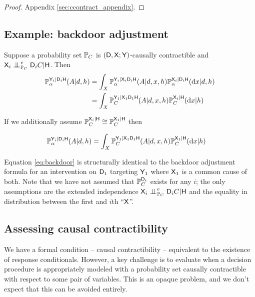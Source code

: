 \begin{proof}
Appendix \ref{sec:ccontract_appendix}.
\end{proof}


\subsection{Example: backdoor adjustment}

Suppose a probability set $\mathbb{P}_C$ is $(\mathsf{D},\mathsf{X};\mathsf{Y})$-causally contractible and $\RV{X}_{i}\CI^e_{\prob{P}_C}\RV{D}_{i}C|\RV{H}$. Then
\begin{align}
    \mathbb{P}_\alpha^{\mathsf{Y}_{i}|\mathsf{D}_{i}\mathsf{H}}(A|d,h) &= \int_X \mathbb{P}_\alpha^{\mathsf{Y}_{i}|\mathsf{X}_{i}\mathsf{D}_{i}\mathsf{H}}(A|d,x,h)\mathbb{P}_\alpha^{\mathsf{X}_{i}|\mathsf{D}_{i}\mathsf{H}}(\mathrm{d}x|d,h)\\
    &= \int_X \mathbb{P}_C^{\mathsf{Y}_{1}|\mathsf{X}_{1}\mathsf{D}_{1}\mathsf{H}}(A|d,x,h)\mathbb{P}_C^{\mathsf{X}_{i}|\mathsf{H}}(\mathrm{d}x|h)
\end{align}

If we additionally assume $\mathbb{P}_C^{\mathsf{X}_{i}|\mathsf{H}}\cong \mathbb{P}_C^{\mathsf{X}_{1}|\mathsf{H}}$ then 

\begin{align}
    \mathbb{P}_\alpha^{\mathsf{Y}_{i}|\mathsf{D}_{i}\mathsf{H}}(A|d,h) &= \int_X \mathbb{P}_C^{\mathsf{Y}_{1}|\mathsf{X}_{1}\mathsf{D}_{1}\mathsf{H}}(A|d,x,h)\mathbb{P}_C^{\mathsf{X}_{1}|\mathsf{H}}(\mathrm{d}x|h)\label{eq:backdoor}
\end{align}

Equation \ref{eq:backdoor} is structurally identical to the backdoor adjustment formula for an intervention on $\mathsf{D}_1$ targeting $\mathsf{Y}_1$ where $\mathsf{X}_1$ is a common cause of both. Note that we have not assumed that $\mathbb{P}_C^{\mathsf{D}_i}$ exists for any $i$; the only assumptions are the extended independence $\RV{X}_{i}\CI^e_{\prob{P}_C}\RV{D}_{i}C|\RV{H}$ and the equality in distribution between the first and $i$th ``$\mathsf{X}$''.

\subsection{Assessing causal contractibility}

We have a formal condition -- causal contractibility -- equivalent to the existence of response conditionals. However, a key challenge is to evaluate when a decision procedure is appropriately modeled with a probability set causally contractible with respect to some pair of variables. This is an opaque problem, and we don't expect that this can be avoided entirely. 

